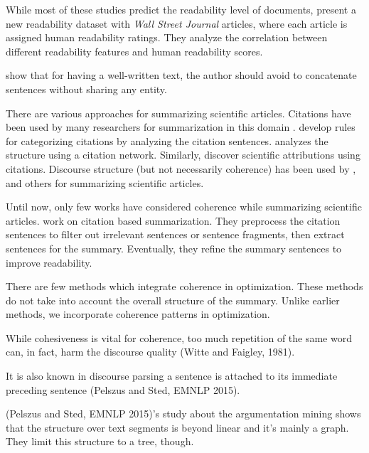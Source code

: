 While most of these studies predict the readability level of documents,  present a new readability dataset with \textit{Wall Street Journal} articles, where each article is assigned human readability ratings. 
They analyze the correlation between different readability features and human readability scores. 

 show that for having a well-written text, the author should avoid to concatenate sentences without sharing any entity.


There are various approaches for summarizing scientific articles. Citations have been used by many researchers for summarization in this domain \cite{elkiss08,mohammad09,qazvinian08,abu-jbara11}.  develop rules for categorizing citations by analyzing the citation sentences.  analyzes the structure using a citation network. Similarly,  discover scientific attributions using citations. Discourse structure (but not necessarily coherence) has been used by ,  and others for summarizing scientific articles.


Until now, only few works have considered coherence while summarizing scientific articles.  work on citation based summarization. They preprocess the citation sentences to filter out irrelevant sentences or sentence fragments, then extract sentences for the summary. Eventually, they refine the summary sentences to improve readability.

There are few methods \cite{hirao13,parveen15a,gorinski15} which integrate coherence in optimization.
These methods do not take into account the overall structure of the summary. Unlike earlier methods, we incorporate coherence patterns in optimization.


While cohesiveness is vital for coherence, too much repetition of the same word can, in fact, harm the discourse quality (Witte and Faigley, 1981). 


It is also known in discourse parsing a sentence is attached to its immediate preceding sentence (Pelszus and Sted, EMNLP 2015). 


(Pelszus and Sted, EMNLP 2015)'s study about the argumentation mining shows that the structure over text segments is beyond linear and it's mainly a graph. They limit this structure to a tree, though.